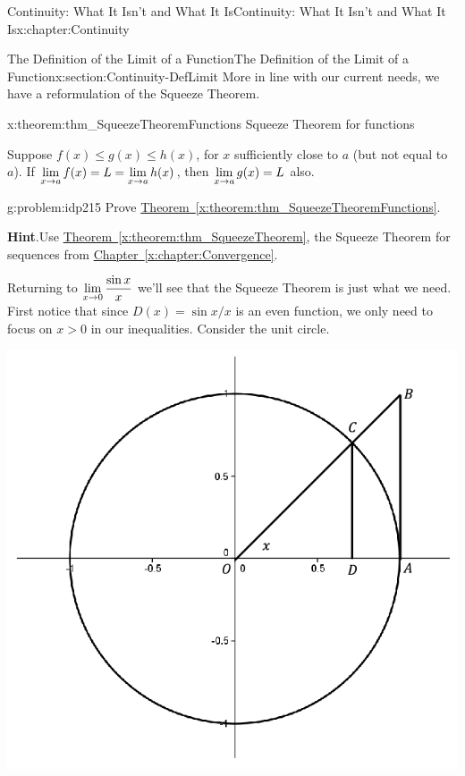 \begin{chapterptx}{Continuity: What It Isn't and What It Is}{}{Continuity: What It Isn't and What It Is}{}{}{x:chapter:Continuity}
\begin{sectionptx}{The Definition of the Limit of a Function}{}{The Definition of the Limit of a Function}{}{}{x:section:Continuity-DefLimit}
		More in line with our current needs, we have a reformulation of the Squeeze Theorem.%
		\begin{theorem}{}{}{x:theorem:thm_SqueezeTheoremFunctions}%
			\alert{Squeeze Theorem for functions}%
			\par
			 Suppose \(f(x)\le g(x) \le h(x)\), for \(x\) sufficiently close to \(a\) (but not equal to \(a\)). If \({\displaystyle\lim_{x\rightarrow a}f(x)}=L={\displaystyle\lim_{x\rightarrow a}h(x)}\), then \({\displaystyle\lim_{x\rightarrow a}g(x)}=L\) also.%
		\end{theorem}
		\begin{problem}{}{g:problem:idp215}%
			 Prove \hyperref[x:theorem:thm_SqueezeTheoremFunctions]{Theorem~{\xreffont\ref{x:theorem:thm_SqueezeTheoremFunctions}}}.%
			\par\smallskip%
			\noindent\textbf{\blocktitlefont Hint}.\hypertarget{g:hint:idp216}{}\quad{}Use \hyperref[x:theorem:thm_SqueezeTheorem]{Theorem~{\xreffont\ref{x:theorem:thm_SqueezeTheorem}}}, the Squeeze Theorem for sequences from \hyperref[x:chapter:Convergence]{Chapter~{\xreffont\ref{x:chapter:Convergence}}}.%
		\end{problem}
		Returning to \({\displaystyle\lim_{x\rightarrow 0}\frac{\sin x}{x}}\) we'll see that the Squeeze Theorem is just what we need.  First notice that since \(D(x)=\sin x/x\) is an even function, we only need to focus on \(x>0\) in our inequalities.  Consider the unit circle.%
		\begin{image}{0.2}{0.6}{0.2}%
			\includegraphics[width=\linewidth]{external/images/UnitCircle.png}

\end{image}
\end{sectionptx}
\end{chapterptx}
